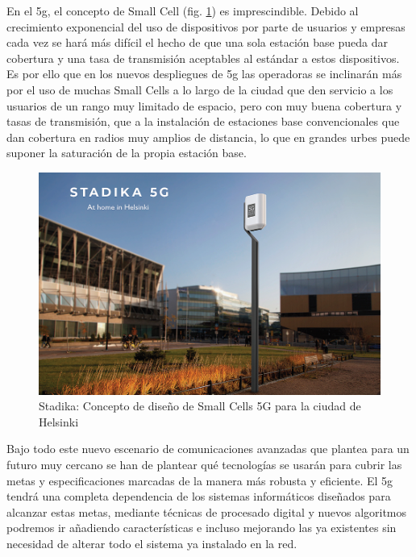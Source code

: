 \par En el \gls{5g}, el concepto de Small Cell (fig. \ref{fig:stadika}) es imprescindible. Debido al crecimiento exponencial del uso de dispositivos por parte de usuarios y empresas cada vez se hará más difícil el hecho de que una sola estación base pueda dar cobertura y una tasa de transmisión aceptables al estándar a estos dispositivos. Es por ello que en los nuevos despliegues de \gls{5g} las operadoras se inclinarán más por el uso de muchas Small Cells a lo largo de la ciudad que den servicio a los usuarios de un rango muy limitado de espacio, pero con muy buena cobertura y tasas de transmisión, que a la instalación de estaciones base convencionales que dan cobertura en radios muy amplios de distancia, lo que en grandes urbes puede suponer la saturación de la propia estación base.

\begin{figure}[h]
    \centering
        \includegraphics[width=15cm]{archivos/stadika}
        \caption{Stadika: Concepto de diseño de Small Cells 5G para la ciudad de Helsinki}
        \label{fig:stadika}
\end{figure}

\par Bajo todo este nuevo escenario de comunicaciones avanzadas que plantea para un futuro muy cercano se han de plantear qué tecnologías se usarán para cubrir las metas y especificaciones marcadas de la manera más robusta y eficiente. El \gls{5g} tendrá una completa dependencia de los sistemas informáticos diseñados para alcanzar estas metas, mediante técnicas de procesado digital y nuevos algoritmos podremos ir añadiendo características e incluso mejorando las ya existentes sin necesidad de alterar todo el sistema ya instalado en la red.

